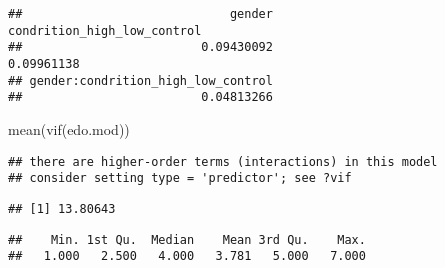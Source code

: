 \documentclass[
]{article}
\newenvironment{Shaded}{\begin{snugshade}}{\end{snugshade}}
\newcommand{\DecValTok}[1]{\textcolor[rgb]{0.00,0.00,0.81}{#1}}
\newcommand{\FunctionTok}[1]{\textcolor[rgb]{0.00,0.00,0.00}{#1}}
\newcommand{\NormalTok}[1]{#1}
\newcommand{\OtherTok}[1]{\textcolor[rgb]{0.56,0.35,0.01}{#1}}
\newcommand{\SpecialCharTok}[1]{\textcolor[rgb]{0.00,0.00,0.00}{#1}}
\begin{document}
\begin{verbatim}
##                             gender        condrition_high_low_control 
##                         0.09430092                         0.09961138 
## gender:condrition_high_low_control 
##                         0.04813266
\end{verbatim}

\begin{Shaded}
\begin{Highlighting}[]
\FunctionTok{mean}\NormalTok{(}\FunctionTok{vif}\NormalTok{(edo.mod))}
\end{Highlighting}
\end{Shaded}

\begin{verbatim}
## there are higher-order terms (interactions) in this model
## consider setting type = 'predictor'; see ?vif
\end{verbatim}

\begin{verbatim}
## [1] 13.80643
\end{verbatim}

\begin{Shaded}
\end{Shaded}

\begin{Shaded}
\end{Shaded}

\begin{verbatim}
##    Min. 1st Qu.  Median    Mean 3rd Qu.    Max. 
##   1.000   2.500   4.000   3.781   5.000   7.000
\end{verbatim}

\begin{Shaded}
\end{Shaded}
\end{document}
